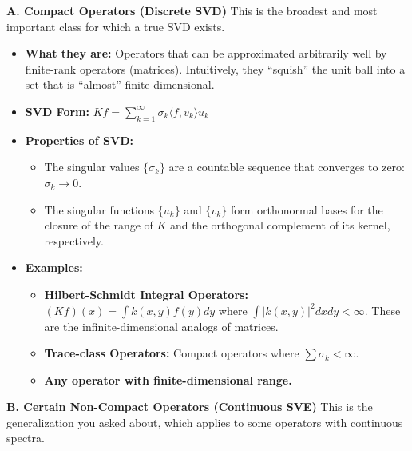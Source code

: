 \documentclass[aps,prl,reprint]{revtex4-2}
\begin{document}
\textbf{A. Compact Operators (Discrete SVD)} This is the broadest and most
important class for which a true SVD exists.

\begin{itemize}
\item \textbf{What they are:} Operators that can be approximated arbitrarily
well by finite-rank operators (matrices). Intuitively, they ``squish'' the
unit ball into a set that is ``almost'' finite-dimensional.

\item \textbf{SVD Form:} $Kf = \sum_{k=1}^\infty \sigma_k \langle f, v_k
\rangle u_k$

\item \textbf{Properties of SVD:} 

\begin{itemize}
\item The singular values $\{\sigma_k\}$ are a countable sequence that
converges to zero: $\sigma_k \to 0$. 

\item The singular functions $\{u_k\}$ and $\{v_k\}$ form orthonormal bases
for the closure of the range of $K$ and the orthogonal complement of its
kernel, respectively. 
\end{itemize}

\item \textbf{Examples:} 

\begin{itemize}
\item \textbf{Hilbert-Schmidt Integral Operators:} $(Kf)(x) = \int k(x,
y)f(y) dy$ where $\int |k(x,y)|^2 dx dy < \infty$. These are the
infinite-dimensional analogs of matrices. 

\item \textbf{Trace-class Operators:} Compact operators where $\sum \sigma_k
< \infty$. 

\item \textbf{Any operator with finite-dimensional range.} 
\end{itemize}
\end{itemize}

\textbf{B. Certain Non-Compact Operators (Continuous SVE)} This is the
generalization you asked about, which applies to some operators with
continuous spectra.
\end{document}
